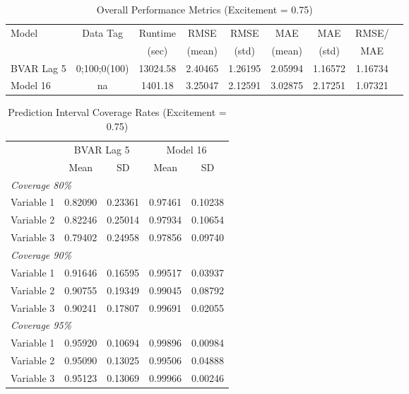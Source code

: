 
\begin{table}[htbp]
\centering
\caption{Overall Performance Metrics (Excitement = 0.75)}
\label{tab:overall_0p75}
\begin{tabular}{lcccccccc}
\toprule
Model & Data Tag & Runtime & RMSE & RMSE & MAE & MAE & RMSE/ \\
      &          & (sec)   & (mean) & (std) & (mean) & (std) & MAE \\
\midrule
BVAR Lag 5 & 0;100;0(100) & 13024.58 & 2.40465 & 1.26195 & 2.05994 & 1.16572 & 1.16734 \\
Model 16 & na & 1401.18 & 3.25047 & 2.12591 & 3.02875 & 2.17251 & 1.07321 \\
\bottomrule
\end{tabular}
\end{table}

\begin{table}[htbp]
\centering
\caption{Prediction Interval Coverage Rates (Excitement = 0.75)}
\label{tab:coverage_0p75}
\begin{tabular}{lcccc}
\toprule
 & \multicolumn{2}{c}{BVAR Lag 5} & \multicolumn{2}{c}{Model 16} \\
\cmidrule(lr){2-3} \cmidrule(lr){4-5}
 & Mean & SD & Mean & SD \\
\midrule
\multicolumn{5}{l}{\textit{Coverage 80\%}} \\
Variable 1 & 0.82090 & 0.23361 & 0.97461 & 0.10238 \\
Variable 2 & 0.82246 & 0.25014 & 0.97934 & 0.10654 \\
Variable 3 & 0.79402 & 0.24958 & 0.97856 & 0.09740 \\
\multicolumn{5}{l}{\textit{Coverage 90\%}} \\
Variable 1 & 0.91646 & 0.16595 & 0.99517 & 0.03937 \\
Variable 2 & 0.90755 & 0.19349 & 0.99045 & 0.08792 \\
Variable 3 & 0.90241 & 0.17807 & 0.99691 & 0.02055 \\
\multicolumn{5}{l}{\textit{Coverage 95\%}} \\
Variable 1 & 0.95920 & 0.10694 & 0.99896 & 0.00984 \\
Variable 2 & 0.95090 & 0.13025 & 0.99506 & 0.04888 \\
Variable 3 & 0.95123 & 0.13069 & 0.99966 & 0.00246 \\
\bottomrule
\end{tabular}
\end{table}

